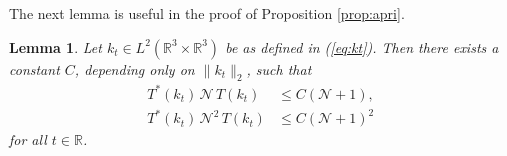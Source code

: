 \documentclass[11pt,a4paper]{article}
\newtheorem{cor}[thm]{Corollary}
\newtheorem{lemma}[thm]{Lemma}
\newtheorem*{rem}{Remark}
\newcommand{\bR}{{\mathbb R}}
\newcommand{\R}{\mathbb{R}}
\newcommand{\N}{\mathcal{N}}
\newcommand{\K}{\mathcal{K}}
\newcommand{\fock}{\mathcal{F}}		%
\newcommand{\Ncal}{\mathcal{N}}		%
\newcommand{\scal}[2]{\big<#1,#2\big>} %
\newcommand{\norm}[1]{\lVert#1\rVert}	%
\newcommand{\bd}{\begin{displaymath}}			%
\newcommand{\ed}{\end{displaymath}}
\begin{document}
The next lemma is useful in the proof of Proposition \ref{prop:apri}.
\begin{lemma} \label{lm:TNT}
Let $k_t \in L^2(\R^3 \times \R^3)$ be as defined in (\ref{eq:kt}). Then there exists a constant $C$, depending only on $\| k_t \|_2$, such that
\begin{align}
    T^* (k_t)  \, \N \, T (k_t) & \le C (\N+1), \label{eq:TNT} \\
    T^* (k_t) \, \N^2 \, T (k_t) & \le C (\N+1)^2 \label{eq:TN2T} %
  \end{align}
for all $t \in \bR$.
\end{lemma}



\end{document}
